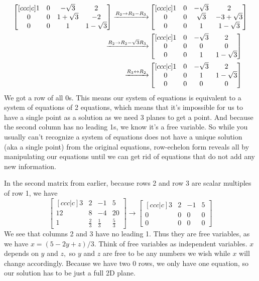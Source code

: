 \documentclass[12pt]{scrartcl}
\begin{document}
\begin{align*}
    \begin{bmatrix}[ccc|c]
        1 & 0 & -\sqrt{3} & 2 \\
        0 & 0 & 1 + \sqrt3 & -2 \\
        0 & 0 & 1 & 1 - \sqrt3
    \end{bmatrix}
    \xto[R_2 \to R_2 - R_3]&
    \begin{bmatrix}[ccc|c]
        1 & 0 & -\sqrt3 & 2 \\
        0 & 0 & \sqrt3 & -3 + \sqrt3 \\
        0 & 0 & 1 & 1 - \sqrt3
    \end{bmatrix} \\
    \xto[R_2 \to R_2 - \sqrt3 R_3]&
    \begin{bmatrix}[ccc|c]
        1 & 0 & -\sqrt3 & 2 \\
        0 & 0 & 0 & 0 \\
        0 & 0 & 1 & 1 - \sqrt3
    \end{bmatrix} \\
    \xto[R_3 \lrto R_2]&
    \begin{bmatrix}[ccc|c]
        1 & 0 & -\sqrt{3} & 2 \\
        0 & 0 & 1 & 1 - \sqrt3 \\
        0 & 0 & 0 & 0
    \end{bmatrix}
\end{align*}
We got a row of all 0s. This means our system of equations is equivalent to a system of equations of 2 equations, which means that it's impossible for us to have a single point as a solution as we need 3 planes to get a point. And because the second column has no leading 1s, we know it's a free variable. So while you usually can't recognize a system of equations does not have a unique solution (aka a single point) from the original equations, row-echelon form reveals all by manipulating our equations until we can get rid of equations that do not add any new information.

In the second matrix from earlier, because rows 2 and row 3 are scalar multiples of row 1, we have
\[
    \begin{bmatrix}[ccc|c]
        3 & 2 & -1 & 5 \\
        12 & 8 & -4 & 20 \\
        1 & \frac{2}{3} & \frac{1}{3} & \frac{5}{3}
    \end{bmatrix}
    \longrightarrow
    \begin{bmatrix}[ccc|c]
        3 & 2 & -1 & 5 \\
        0 & 0 & 0 & 0 \\
        0 & 0 & 0 & 0
    \end{bmatrix}
\]
We see that columns 2 and 3 have no leading 1. Thus they are free variables, as we have $x = (5 - 2y + z)/3$. Think of free variables as independent variables. $x$ depends on $y$ and $z,$ so $y$ and $z$ are free to be any numbers we wish while $x$ will change accordingly. Because we have two 0 rows, we only have one equation, so our solution has to be just a full 2D plane.
\end{document}
